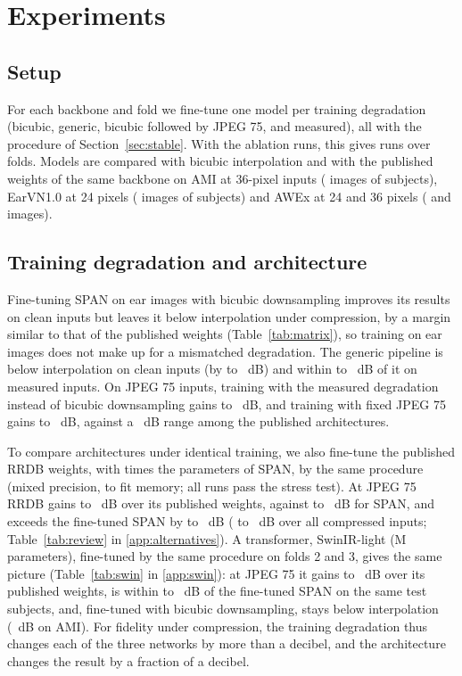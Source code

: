 \section{Experiments}
\label{sec:experiments}

\subsection{Setup}
For each backbone and fold we fine-tune one model per training degradation (bicubic, generic, bicubic followed by JPEG 75, and measured), all with the procedure of Section~\ref{sec:stable}. With the ablation runs, this gives \NRuns{} runs over \NFolds{} folds. Models are compared with bicubic interpolation and with the published weights of the same backbone on AMI at 36-pixel inputs (\NAmiImg{} images of \NAmiSubj{} subjects), EarVN1.0 at 24 pixels (\NEarvnImg{} images of \NEarvnSubj{} subjects) and AWEx at 24 and 36 pixels (\NAwexSImg{} and \NAwexMImg{} images).

\subsection{Training degradation and architecture}
Fine-tuning SPAN on ear images with bicubic downsampling improves its results on clean inputs but leaves it below interpolation under compression, by a margin similar to that of the published weights (Table~\ref{tab:matrix}), so training on ear images does not make up for a mismatched degradation. The generic pipeline is below interpolation on clean inputs (by \GenVsBicCleanMin{} to \GenVsBicCleanMax{}~dB) and within \GenVsBicEstMin{} to \GenVsBicEstMax{}~dB of it on measured inputs. On JPEG 75 inputs, training with the measured degradation instead of bicubic downsampling gains \DegEffMin{} to \DegEffMax{}~dB, and training with fixed JPEG 75 gains \JpgEffMin{} to \JpgEffMax{}~dB, against a \SpreadQLow{}~dB range among the published architectures.

To compare architectures under identical training, we also fine-tune the published RRDB weights, with \ParamsRatio{} times the parameters of SPAN, by the same procedure (mixed precision, to fit memory; all runs pass the stress test). At JPEG 75 RRDB gains \RevRrdbGainQMin{} to \RevRrdbGainQMax{}~dB over its published weights, against \RevSpanGainQMin{} to \RevSpanGainQMax{}~dB for SPAN, and exceeds the fine-tuned SPAN by \RevRrdbVsEstQMin{} to \RevRrdbVsEstQMax{}~dB (\RevRrdbVsEstMin{} to \RevRrdbVsEstMax{}~dB over all compressed inputs; Table~\ref{tab:review} in \ref{app:alternatives}). A transformer, SwinIR-light (\SwinParams{}M parameters), fine-tuned by the same procedure on folds 2 and 3, gives the same picture (Table~\ref{tab:swin} in \ref{app:swin}): at JPEG 75 it gains \SwinGainQMin{} to \SwinGainQMax{}~dB over its published weights, is within \SwinVsSpanQMin{} to \SwinVsSpanQMax{}~dB of the fine-tuned SPAN on the same test subjects, and, fine-tuned with bicubic downsampling, stays below interpolation (\SwinBicTrQLow{}~dB on AMI). For fidelity under compression, the training degradation thus changes each of the three networks by more than a decibel, and the architecture changes the result by a fraction of a decibel.

